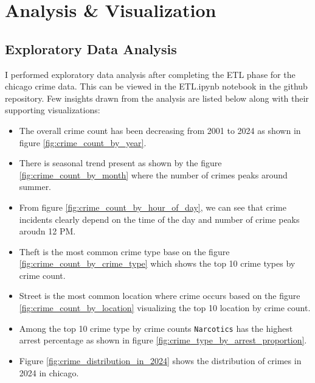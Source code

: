 \documentclass[12pt]{article}
\begin{document}
\section{Analysis \& Visualization}

\subsection*{Exploratory Data Analysis}
I performed exploratory data analysis after completing the ETL phase for the chicago crime data. This can be viewed in the ETL.ipynb notebook in the github repository. Few insights drawn from the analysis are listed below along with their supporting visualizations:





\begin{itemize}
    \item The overall crime count has been decreasing from 2001 to 2024 as shown in figure \ref{fig:crime_count_by_year}.
    \item There is seasonal trend present as shown by the figure \ref{fig:crime_count_by_month} where the number of crimes peaks around summer.
    \item From figure \ref{fig:crime_count_by_hour_of_day}, we can see that crime incidents clearly depend on the time of the day and number of crime peaks aroudn 12 PM.
    \item Theft is the most common crime type base on the figure \ref{fig:crime_count_by_crime_type} which shows the top 10 crime types by crime count.
    \item Street is the most common location where crime occurs based on the figure \ref{fig:crime_count_by_location} visualizing the top 10 location by crime count.
    \item Among the top 10 crime type by crime counts \texttt{Narcotics} has the highest arrest percentage as shown in figure \ref{fig:crime_type_by_arrest_proportion}.
    \item Figure \ref{fig:crime_distribution_in_2024} shows the distribution of crimes in 2024 in chicago.
\end{itemize}

\end{document}

